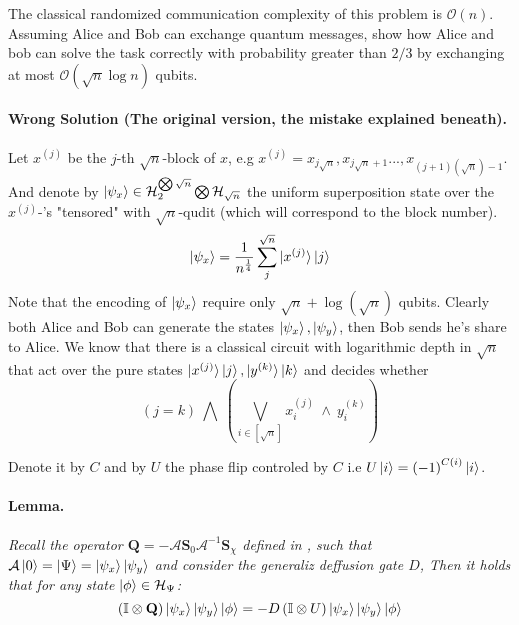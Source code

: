 \documentclass{article}
\newcommand{\onotation}[1]{\(\mathcal{O} \left( {#1}  \right) \)}
\newcommand{\ona}[1]{\onotation{#1}}
\begin{document}
\begin{multicols*}{2}
The classical randomized communication complexity of this problem is \ona{n}.
Assuming Alice and Bob can exchange quantum messages, show how Alice and bob can solve the task
correctly with probability greater than \(2/3\) by exchanging at most \ona{\sqrt{n}\log n } qubits.


\paragraph{Wrong Solution (The original version, the mistake explained beneath).}
Let \( x^{(j)} \) be the \(j\)-th \(\sqrt{n}\)-block of \(x\), e.g \(x^{(j)} = x_{j\sqrt{n}},x_{j\sqrt{n}+1}...,x_{(j+1)(\sqrt{n})-1}  \). And denote by \( \ket{\psi_x} \in \mathcal{H}_{2}^{\bigotimes \sqrt{n}} \bigotimes \mathcal{H}_{\sqrt{n}} \) the uniform superposition state over the \( x^{(j)}\)-'s "tensored" with \(\sqrt{n}\)-qudit (which will correspond to the block number). 
\[ \ket{\psi_x} = \frac{1}{n^\frac{1}{4}}\sum_{j}^{\sqrt{n}}\ket{x^{(j)}}\ket{j} \] Note that the encoding of \( \ket{\psi_x} \) require only \( \sqrt{n} + \log(\sqrt{n}) \) qubits.
Clearly both Alice and Bob can generate the states \( \ket{\psi_x}, \ket{\psi_y} \), then Bob sends he's share to Alice.
We know that there is a classical circuit with logarithmic depth in \( \sqrt{n} \) that act over the pure states \( \ket{x^{(j)}}\ket{j} , \ket{y^{(k)}}\ket{k} \) and decides whether \[ \left( j =  k \right) \ \bigwedge  \ \left( \bigvee_{i \in [ \sqrt{n} ] } x^{(j)}_{i} \ \wedge \  y^{(k)}_{i} \right)   \]


Denote it by \( C \) and by \( U \) the phase flip controled by $C$ i.e $U\ket{i}=\left( -1 \right)^{C\left( i \right)}\ket{i}$.

\paragraph{Lemma.} \textit{ Recall the operator $\mathbf Q  = - {\mathcal A}  {\mathbf S}_0 
  {\mathcal A}^{-1}  {\mathbf S}_\chi$ defined in \cite{Brassard_2002}, such that $ \mathcal A \ket{0} = \ket{\Psi} = \ket{\psi_{x}}\ket{\psi_{y}}$ and 
consider the generaliz deffusion gate $D$, Then it holds that for any state $ \ket{\phi} \in \mathcal{H}_{\Psi} $:}
\begin{equation*}
  \left(  \mathbb{I} \otimes \mathbf Q \right) \ket{\psi_{x}}\ket{\psi_{y}} \ket{\phi} =  - D \left( \mathbb{I} \otimes U \right)  \ket{\psi_{x}}\ket{\psi_{y}} \ket{\phi} 
\end{equation*}


\end{multicols*}
\end{document}
